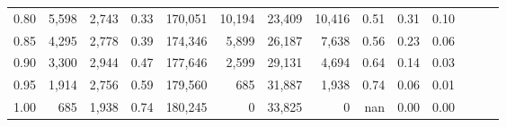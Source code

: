 \begin{tabular}{rrrrrrrrrrrrrr}
0.80 &   5,598 &  2,743 &  0.33 &  170,051 &   10,194 &  23,409 &  10,416 &  0.51 &  0.31 &      0.10 \\
0.85 &   4,295 &  2,778 &  0.39 &  174,346 &    5,899 &  26,187 &   7,638 &  0.56 &  0.23 &      0.06 \\
0.90 &   3,300 &  2,944 &  0.47 &  177,646 &    2,599 &  29,131 &   4,694 &  0.64 &  0.14 &      0.03 \\
0.95 &   1,914 &  2,756 &  0.59 &  179,560 &      685 &  31,887 &   1,938 &  0.74 &  0.06 &      0.01 \\
1.00 &     685 &  1,938 &  0.74 &  180,245 &        0 &  33,825 &       0 &   nan &  0.00 &      0.00 \\
\bottomrule
\end{tabular}
